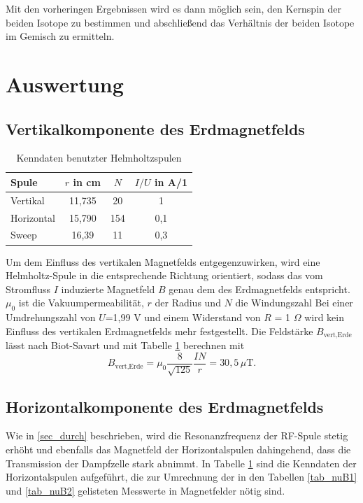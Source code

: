 Mit den vorheringen Ergebnissen wird es dann möglich sein, den Kernspin der beiden Isotope zu bestimmen und abschließend das Verhältnis der beiden Isotope im Gemisch zu ermitteln.

\section{Auswertung}
\subsection{Vertikalkomponente des Erdmagnetfelds}
\begin{table}[H]
 \begin{tabular}{l|c|c|c}
  Spule & $r$ in cm & $N$ & $I/U$ in A/1\\
  \hline
  Vertikal & 11,735 & 20 & 1\\
  Horizontal & 15,790 & 154 & 0,1\\
  Sweep & 16,39 & 11 & 0,3
 \end{tabular}
\caption{Kenndaten benutzter Helmholtzspulen}
\label{tab_SpulenHor}
\end{table}
Um dem Einfluss des vertikalen Magnetfelds entgegenzuwirken, wird eine Helmholtz-Spule in die entsprechende Richtung orientiert, sodass das vom 
Stromfluss $I$ induzierte Magnetfeld $B$ genau dem des Erdmagnetfelds entspricht. $\mu_0$ ist die Vakuumpermeabilität, $r$ der Radius und $N$ die Windungszahl
Bei einer Umdrehungszahl von $U$=1,99 V und einem Widerstand von $R$ = 1 $\Omega$ wird kein Einfluss des vertikalen Erdmagnetfelds mehr festgestellt. 
Die Feldstärke $B_{\text{vert,Erde}}$ lässt nach Biot-Savart und mit Tabelle \ref{tab_SpulenHor} berechnen mit
\begin{equation}
 B_{\text{vert,Erde}} = \mu_0 \frac{8}{\sqrt{125}}\frac{I N}{r} = 30,5 \, \mu\text{T}.
\end{equation}
\subsection{Horizontalkomponente des Erdmagnetfelds}
Wie in \ref{sec_durch} beschrieben, wird die Resonanzfrequenz der RF-Spule stetig erhöht und ebenfalls das Magnetfeld der Horizontalspulen dahingehend,
dass die Transmission der Dampfzelle stark abnimmt. In Tabelle \ref{tab_SpulenHor} sind die Kenndaten der Horizontalspulen aufgeführt, die zur Umrechnung
der in den Tabellen \ref{tab_nuB1} und \ref{tab_nuB2} gelisteten Messwerte in Magnetfelder nötig sind.



